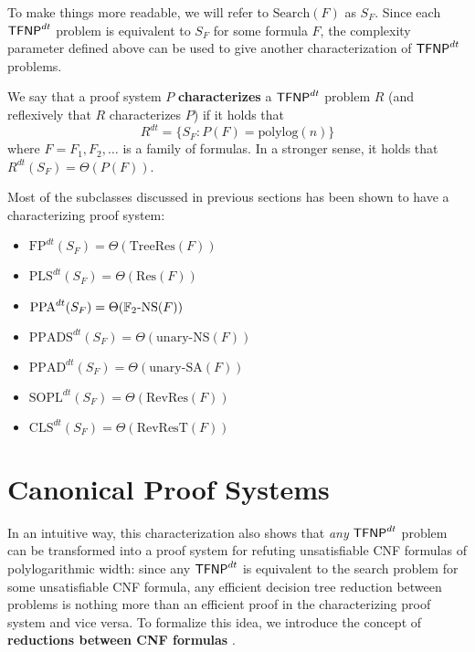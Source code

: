 To make things more readable, we will refer to $\mathrm{Search}(F)$ as $S_F$. Since each $\mathsf{TFNP}^{dt}$ problem is equivalent to $S_F$ for some formula $F$, the complexity parameter defined above can be used to give another characterization of $\mathsf{TFNP}^{dt}$ problems.

\begin{definition}
    We say that a proof system $P$ \textbf{characterizes} a $\mathsf{TFNP}^{dt}$ problem $R$ (and reflexively that $R$ characterizes $P$) if it holds that \[R^{dt} = \{S_F : P(F) = \mathrm{polylog}(n)\}\]
    where $F = F_1, F_2, \ldots$ is a family of formulas. In a stronger sense, it holds that $R^{dt}(S_F) = \Theta(P(F))$. 
\end{definition}

Most of the \TFNP subclasses discussed in previous sections has been shown to have a characterizing proof system:
\begin{itemize}
    \item $\mathrm{FP}^{dt}(S_F) = \Theta(\mathrm{TreeRes}(F))$ \cite{search_problems_dt_model}
    \item $\mathrm{PLS}^{dt}(S_F) = \Theta(\mathrm{Res}(F))$  \cite{approx_counting}
    \item $\mathrm{PPA}^{dt}(S_F) = \Theta(\mathbb{F}_2\mathrm{\text{-}NS}(F))$ \cite{adventures_monotone_tfnp}
    \item $\mathrm{PPADS}^{dt}(S_F) = \Theta(\mathrm{unary\text{-}NS}(F))$ \cite{separations_proof_complexity}
    \item $\mathrm{PPAD}^{dt}(S_F) = \Theta(\mathrm{unary\text{-}SA}(F))$ \cite{separations_proof_complexity}
    \item $\mathrm{SOPL}^{dt}(S_F) = \Theta(\mathrm{RevRes}(F))$ \cite{separations_proof_complexity}
    \item $\mathrm{CLS}^{dt}(S_F) = \Theta(\mathrm{RevResT}(F))$ \cite{separations_proof_complexity}
\end{itemize}

\newpage

\section{Canonical Proof Systems}

In an intuitive way, this characterization also shows that \textit{any} $\mathsf{TFNP}^{dt}$ problem can be transformed into a proof system for refuting unsatisfiable CNF formulas of polylogarithmic width: since any $\mathsf{TFNP}^{dt}$ is equivalent to the search problem for some unsatisfiable CNF formula, any efficient decision tree reduction between problems is nothing more than an efficient proof in the characterizing proof system and vice versa. To formalize this idea, we introduce the concept of \textbf{reductions between CNF formulas} \cite{tfnp_characterization}.

